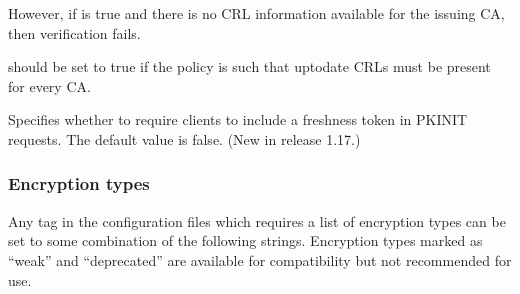 \documentclass[letterpaper,10pt,english]{sphinxmanual}
\begin{document}
\begin{description}
\sphinxAtStartPar
However, if  is true and there is
no CRL information available for the issuing CA, then verification
fails.

\sphinxAtStartPar
{} should be set to true if the
policy is such that up\sphinxhyphen{}to\sphinxhyphen{}date CRLs must be present for every CA.

\item[{\sphinxstylestrong{pkinit\_require\_freshness}}] \leavevmode
\sphinxAtStartPar
Specifies whether to require clients to include a freshness token
in PKINIT requests.  The default value is false.  (New in release
1.17.)

\end{description}


\subsubsection{Encryption types}
\label{\detokenize{admin/conf_files/kdc_conf:encryption-types}}\label{\detokenize{admin/conf_files/kdc_conf:id6}}
\sphinxAtStartPar
Any tag in the configuration files which requires a list of encryption
types can be set to some combination of the following strings.
Encryption types marked as “weak” and “deprecated” are available for
compatibility but not recommended for use.
\end{document}
